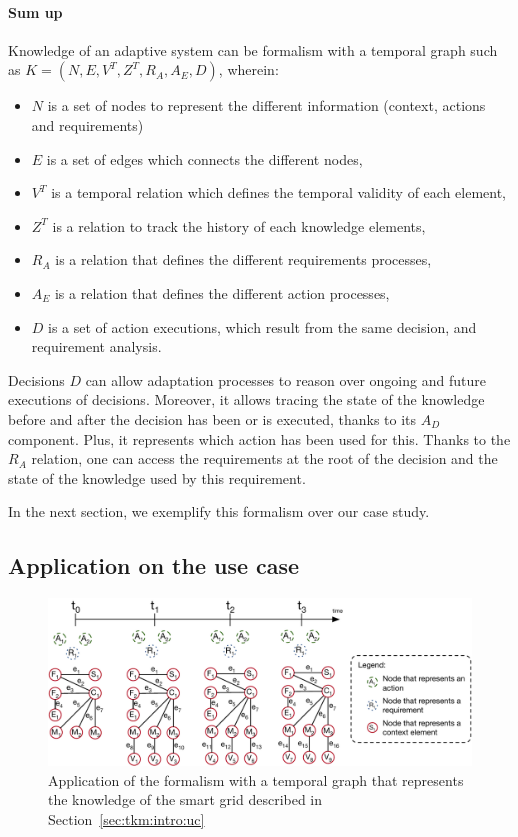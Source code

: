 \paragraph{Sum up}
Knowledge of an adaptive system can be formalism with a temporal graph such as $K = (N, E, V^T, Z^T, R_A, A_E, D)$, wherein:
\begin{itemize}
    \item $N$ is a set of nodes to represent the different information (context, actions and requirements)
    \item $E$ is a set of edges which connects the different nodes,
    \item $V^T$ is a temporal relation which defines the temporal validity of each element,
    \item $Z^T$ is a relation to track the history of each knowledge elements,
    \item $R_A$ is a relation that defines the different requirements processes,
    \item $A_E$ is a relation that defines the different action processes,
    \item $D$ is a set of action executions, which result from the same decision, and requirement analysis.
\end{itemize}

Decisions $D$ can allow adaptation processes to reason over ongoing and future executions of decisions.
Moreover, it allows tracing the state of the knowledge before and after the decision has been or is executed, thanks to its $A_D$ component.
Plus, it represents which action has been used for this.
Thanks to the $R_A$ relation, one can access the requirements at the root of the decision and the state of the knowledge used by this requirement.

In the next section, we exemplify this formalism over our case study.


\subsection{Application on the use case}

\begin{figure}
	\centering
	\includegraphics[width=\linewidth]{img/chapt-tkm/formalism/application}
	\caption{Application of the formalism with a temporal graph that represents the knowledge of the smart grid described in Section~\ref{sec:tkm:intro:uc}}
	\label{fig:tkm:k-formalism:application}
\end{figure}

